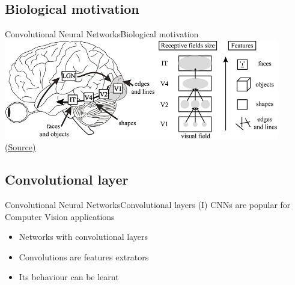 \documentclass[10pt,compress]{beamer} %
\begin{document}
\subsection{Biological motivation}
\begin{frame}{Convolutional Neural Networks}{Biological motivation}
	\centering
	\includegraphics[width=0.9\textwidth]{figs/cortex.png}\\
	\scriptsize\href{https://www.researchgate.net/publication/267872860_Why_vision_is_not_both_hierarchical_and_feedforward/figures?lo=1}{(Source)}\\
\end{frame}

\subsection{Convolutional layer}
\begin{frame}{Convolutional Neural Networks}{Convolutional layers (I)}
    CNNs are popular for Computer Vision applications
	\begin{itemize}
		\item Networks with convolutional layers
        \item Convolutions are features extrators
        \item Its behaviour can be learnt
	\end{itemize}


\end{frame}
\end{document}
